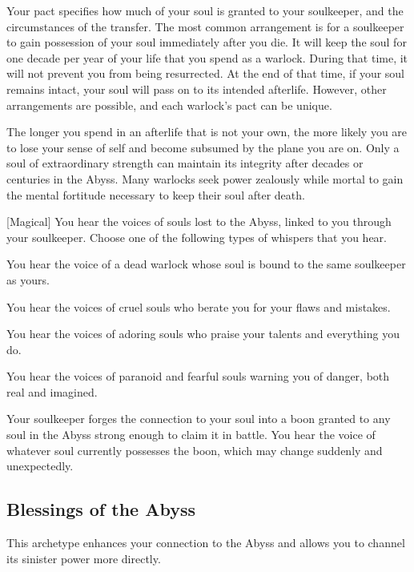         Your pact specifies how much of your soul is granted to your soulkeeper, and the circumstances of the transfer.
        The most common arrangement is for a soulkeeper to gain possession of your soul immediately after you die.
        It will keep the soul for one decade per year of your life that you spend as a warlock.
        During that time, it will not prevent you from being resurrected.
        At the end of that time, if your soul remains intact, your soul will pass on to its intended afterlife.
        However, other arrangements are possible, and each warlock's pact can be unique.

        The longer you spend in an afterlife that is not your own, the more likely you are to lose your sense of self and become subsumed by the plane you are on.
        Only a soul of extraordinary strength can maintain its integrity after decades or centuries in the Abyss.
        Many warlocks seek power zealously while mortal to gain the mental fortitude necessary to keep their soul after death.

        [Magical]
        You hear the voices of souls lost to the Abyss, linked to you through your soulkeeper.
        Choose one of the following types of whispers that you hear.
        {
             You hear the voice of a dead warlock whose soul is bound to the same soulkeeper as yours.

             You hear the voices of cruel souls who berate you for your flaws and mistakes.

             You hear the voices of adoring souls who praise your talents and everything you do.

             You hear the voices of paranoid and fearful souls warning you of danger, both real and imagined.

             Your soulkeeper forges the connection to your soul into a boon granted to any soul in the Abyss strong enough to claim it in battle.
            You hear the voice of whatever soul currently possesses the boon, which may change suddenly and unexpectedly.
        }

    \newpage
    \subsection{Blessings of the Abyss}
        This archetype enhances your connection to the Abyss and allows you to channel its sinister power more directly.

